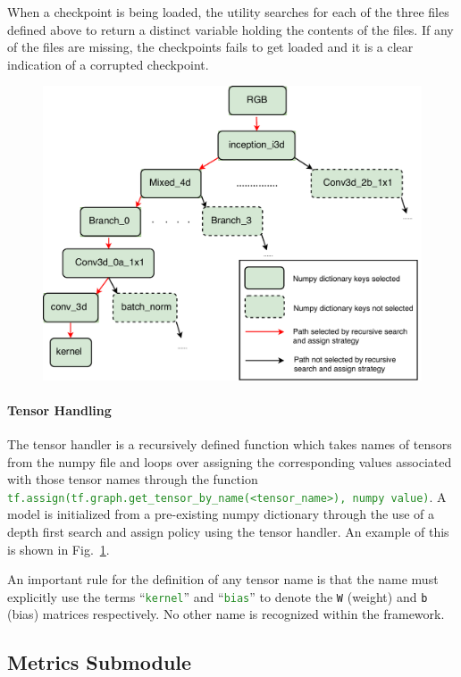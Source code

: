 \documentclass{llncs}
\begin{document}
When a checkpoint is being loaded, the utility searches for each of the three files defined above to return a distinct variable holding the contents of the files.
If any of the files are missing, the checkpoints fails to get loaded and it is a clear indication of a corrupted checkpoint.

\begin{figure}[t!]
\centering
\includegraphics[width=0.7\columnwidth]{images/checkpoint_recursive.pdf}
\caption{}
\label{fig:checkpoint_recursive}
\end{figure}
\paragraph{Tensor Handling}
The tensor handler is a recursively defined function which takes names of tensors from the numpy file and loops over assigning the corresponding values associated with those tensor names through the function \texttt{\textcolor{ForestGreen}{tf.assign(tf.graph.get\_tensor\_by\_name(\textless tensor\_name\textgreater), numpy value)}}.
A model is initialized from a pre-existing numpy dictionary through the use of a depth first search and assign policy using the tensor handler.
An example of this is shown in Fig.~\ref{fig:checkpoint_recursive}.

An important rule for the definition of any tensor name is that the name must explicitly use the terms ``\texttt{\textcolor{ForestGreen}{kernel}}'' and ``\texttt{\textcolor{ForestGreen}{bias}}'' to denote the \texttt{W} (weight) and \texttt{b} (bias) matrices respectively.
No other name is recognized within the framework.



\subsection{Metrics Submodule}
\label{sec:metrics}
\end{document}
